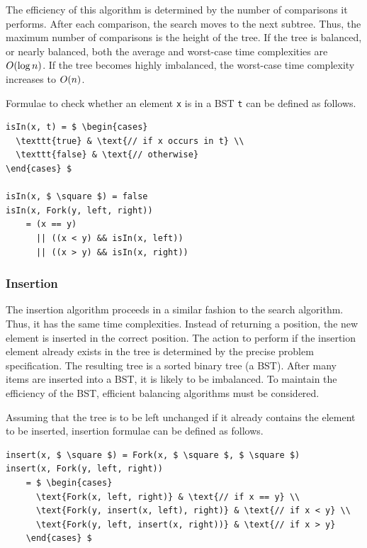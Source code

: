 The efficiency of this algorithm is determined by the number of comparisons it performs.
After each comparison, the search moves to the next subtree.
Thus, the maximum number of comparisons is the height of the tree.
If the tree is balanced, or nearly balanced, both the average and worst-case time complexities are \( O\!\left(\log n\right) \).
If the tree becomes highly imbalanced, the worst-case time complexity increases to \( O\!\left(n\right) \).

Formulae to check whether an element \texttt{x} is in a BST \texttt{t} can be defined as follows.
\begin{lstlisting}[mathescape=true]
isIn(x, t) = $ \begin{cases}
  \texttt{true} & \text{// if x occurs in t} \\
  \texttt{false} & \text{// otherwise}
\end{cases} $

isIn(x, $ \square $) = false
isIn(x, Fork(y, left, right))
    = (x == y)
      || ((x < y) && isIn(x, left))
      || ((x > y) && isIn(x, right))
\end{lstlisting}

\subsubsection{Insertion}

The insertion algorithm proceeds in a similar fashion to the search algorithm.
Thus, it has the same time complexities.
Instead of returning a position, the new element is inserted in the correct position.
The action to perform if the insertion element already exists in the tree is determined by the precise problem specification.
The resulting tree is a sorted binary tree (a BST).
After many items are inserted into a BST, it is likely to be imbalanced.
To maintain the efficiency of the BST, efficient balancing algorithms must be considered.

Assuming that the tree is to be left unchanged if it already contains the element to be inserted, insertion formulae can be defined as follows.
\begin{lstlisting}[mathescape=true]
insert(x, $ \square $) = Fork(x, $ \square $, $ \square $)
insert(x, Fork(y, left, right))
    = $ \begin{cases}
      \text{Fork(x, left, right)} & \text{// if x == y} \\
      \text{Fork(y, insert(x, left), right)} & \text{// if x < y} \\
      \text{Fork(y, left, insert(x, right))} & \text{// if x > y}
    \end{cases} $
\end{lstlisting}

